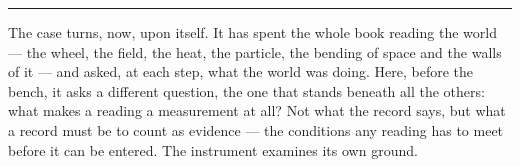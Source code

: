 %
%
%
%

\bigskip
\begin{center}
\rule{0.4\textwidth}{0.4pt}
\end{center}
\bigskip

\noindent The case turns, now, upon itself. It has spent the whole book reading the world --- the wheel, the
field, the heat, the particle, the bending of space and the walls of it --- and asked, at each step, what the
world was doing. Here, before the bench, it asks a different question, the one that stands beneath all the
others: what makes a reading a measurement at all? Not what the record says, but what a record must be to count
as evidence --- the conditions any reading has to meet before it can be entered. The instrument examines its own
ground.

